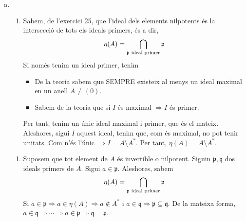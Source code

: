 \documentclass[../main.tex]{subfiles}
\begin{document}
\begin{sol}
\begin{enumerate}[(a)]
    \item \begin{enumerate}[($\Rightarrow$)]
        \item Sabem, de l'exercici 25, que l'ideal dels elements nilpotents és la intersecció de tots els ideals primers, és a dir,
        \begin{equation}
            \notag
            \eta(A) = \bigcap_{\mathfrak{p}\text{ ideal primer}}\mathfrak{p}
        \end{equation}
        Si només tenim un ideal primer, tenim
        \begin{itemize}
            \item De la teoria sabem que SEMPRE existeix al menys un ideal maximal en un anell $A\not=(0)$.
            \item Sabem de la teoria que si $I$ és maximal $\Rightarrow I$ és primer.
        \end{itemize}
        Per tant, tenim un únic ideal maximal i primer, que és el mateix. Aleshores, sigui $I$ aquest ideal, tenim que, com és maximal, no pot tenir unitats. Com n'és l'únic $\Rightarrow I = A\setminus A^*$. Per tant, $\eta(A) = A\setminus A^*$.
    \end{enumerate}
    \begin{enumerate}[($\Leftarrow$)]
        \item Suposem que tot element de $A$ és invertible o nilpotent. Siguin $\mathfrak{p},\mathfrak{q}$ dos ideals primers de $A$. Sigui $a\in \mathfrak{p}$. Aleshores, sabem
        \begin{equation}
            \notag
            \eta(A) = \bigcap_{\mathfrak{p}\text{ ideal primer}}\mathfrak{p}
        \end{equation}
        Si $a\in\mathfrak{p}\Rightarrow a\in \eta(A)\Rightarrow a\not\in A^*$ i $a\in\mathfrak{q}\Rightarrow \mathfrak{p}\subseteq\mathfrak{q}$. De la mateixa forma, $a\in\mathfrak{q}\Rightarrow \cdots \Rightarrow a\in \mathfrak{p}\Rightarrow \mathfrak{q} = \mathfrak{p}$.
    \end{enumerate}
\end{enumerate}
\end{sol}
\end{document}
